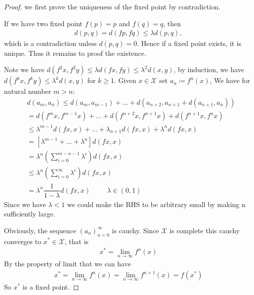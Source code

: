 \documentclass[a4paper]{article}
\theoremstyle{definition}
\begin{document}
\begin{proof}
we first prove the uniqueness of the fixed point by contradiction.

If we have two fixed point $f(p)=p$ and $f(q) = q$, then
\begin{align*}
d(p,q) = d(fp, fq) \leq \lambda d(p, q),
\end{align*}
which is a contradiction unless $d(p, q) = 0$. Hence if a fixed point exists, it is unique. Thus it remains to proof the existence.

Note we have 
$d(f^2x, f^2y) \leq \lambda d(fx, fy) \leq \lambda^2d(x,y)$, by induction, we have $d(f^kx, f^ky) \leq \lambda^k d(x,y)$ for $k \geq 1$. Given $x \in \mathcal{X}$ set $a_n \coloneqq f^n(x)$, We have for natural number $m > n$:
\begin{align*}
&d(a_m, a_n) \leq d(a_m, a_{m-1}) + ... + d(a_{n+2}, a_{n+1} + d(a_{n+1}, a_n))\\
&=d(f^m x, f^{m-1}x) + ... + d(f^{n+2}x, f^{n+1}x) + d(f^{n+1}x, f^{n}x)\\
&\leq\lambda^{m-1}d(fx, x) + ... + \lambda_{n+1}d(fx, x) + \lambda^n d(fx, x)\\
&=[\lambda^{m-1}+...+\lambda^n]d(fx,x)\\
&=\lambda^n(\sum_{i=0}^{m-n-1}\lambda^{i})d(fx,x)\\
&\leq \lambda^n(\sum_{i=0}^{\infty}\lambda^i)d(fx,x)\\
&=\lambda^n \dfrac{1}{1-\lambda}d(fx,x) \hspace{1cm} \text{$\lambda \in (0,1)$}
\end{align*}
Since we have $\lambda < 1$ we could make the RHS to be arbitrary small by making n sufficiently large.

Obviously, the sequence $(a_n)_{n=0}^{\infty}$ is cauchy. Since $\mathcal{X}$ is complete this cauchy converges to $x^{*} \in \mathcal{X}$, that is 
\begin{align*}
x^* = \lim_{n \rightarrow \infty}f^n(x)
\end{align*}
By the property of limit that we can have
\begin{align*}
x^{*} = \lim_{n \rightarrow \infty}f^n(x) = \lim_{n \rightarrow \infty}f^{n+1}(x) = f(x^{*})
\end{align*}
So $x^*$ is a fixed point.

\end{proof}
\end{document}
